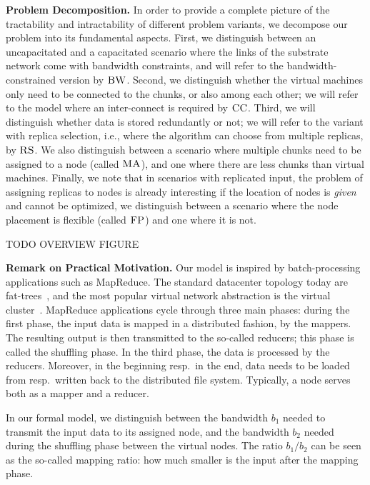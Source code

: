 \documentclass[9pt,twocolumn]{scrartcl}
\newcommand{\CC}{\textsc{CC}}
\newcommand{\FP}{\textsc{FP}}
\newcommand{\RS}{\textsc{RS}}
\newcommand{\BW}{\textsc{BW}}
\newcommand{\MA}{\textsc{MA}}
\begin{document}
\textbf{Problem Decomposition.}
In order to provide a complete picture of the tractability and intractability of different
problem variants, we decompose our problem into its fundamental aspects.
First, we distinguish between an uncapacitated and a capacitated scenario where the links of the substrate network come with bandwidth
constraints, and will refer to the bandwidth-constrained version by $\BW$.
Second, we distinguish whether the virtual machines only need to be connected to the chunks, or also
among each other; we will refer to the model where an inter-connect is required
by $\CC$.
Third, we will distinguish whether data is stored redundantly or not; we will refer to the variant
with replica selection, i.e., where the algorithm can choose from multiple replicas, by $\RS$.
We also distinguish between a scenario where multiple chunks need to be assigned to a node
(called $\MA$), and one where there are less chunks than virtual machines.
Finally, we note that in scenarios with replicated input, the problem of assigning replicas
to nodes is already interesting if the location of nodes is \emph{given} and cannot be optimized,
we distinguish between a scenario where the node placement is flexible (called $\FP$) and one where
it is not.


TODO OVERVIEW FIGURE

\textbf{Remark on Practical Motivation.}
Our model is inspired by batch-processing applications such as MapReduce.
The standard datacenter topology today are fat-trees~\cite{fattree},
and the most popular virtual network abstraction is the virtual cluster~\cite{oktopus}.
MapReduce applications cycle through three main phases: during the first phase,
the input data is mapped in a distributed fashion, by the mappers.
The resulting output is then transmitted to the so-called reducers; this phase is
called the shuffling phase. In the third phase, the data is processed by the reducers.
Moreover, in the beginning resp.~in the end, data needs to be loaded from resp.~written
back to the distributed file system.
Typically, a node serves both as a mapper and a reducer.

In our formal model, we distinguish between the bandwidth $b_1$ needed to
transmit the input data to its assigned node, and the bandwidth $b_2$
needed during the shuffling phase between the virtual nodes.
The ratio $b_1/b_2$ can be seen as the so-called mapping ratio:
how much smaller is the input after the mapping phase.



\end{document}
